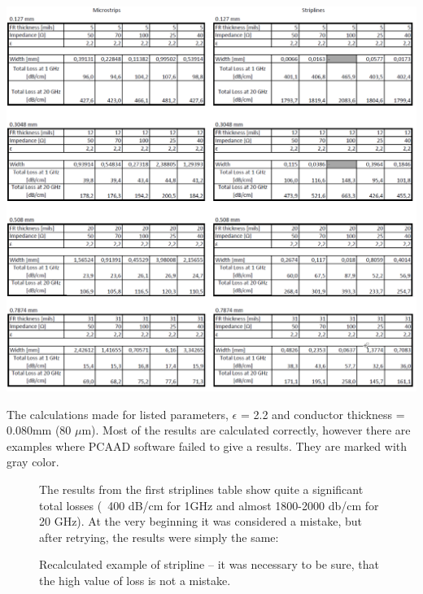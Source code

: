 \documentclass[eng,printmode]{mgr}
\begin{document}
\newpage
\begin{table}[h]
	\centering
	\includegraphics[width=1\linewidth]{table1a}
	\label{fig:microm1}
	\caption{The calculations made for listed parameters, $\epsilon$ = 2.2 and conductor thickness = 0.080mm (80 $\mu$m). Most of the results are calculated correctly, however there are examples where PCAAD software failed to give a results. They are marked with gray color.}
\end{table}

\begin{figure}[H]
\noindent
The results from the first striplines table show quite a significant total losses (~400 dB/cm for 1GHz and almost 1800-2000 db/cm for 20 GHz).
At the very beginning it was considered a mistake, but after retrying, the results were simply the same:
\\

	\label{fig:pcaad2}
	\caption{Recalculated example of stripline -- it was necessary to be sure, that the high value of loss is not a mistake.}
\end{figure}
\end{document}
